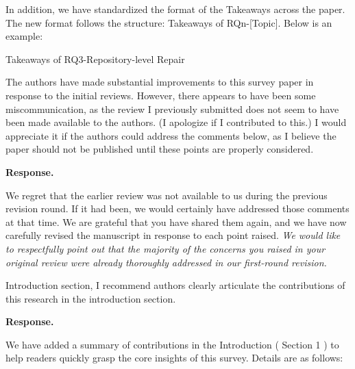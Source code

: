 \documentclass[acmsmall]{acmart}
\begin{document}
	In addition, we have standardized the format of the Takeaways across the paper. The new format follows
	the structure: Takeaways of RQn-[Topic]. Below is an example:

	\color{blue}
	Takeaways of RQ3-Repository-level Repair
	\color{black}

	\begin{tcolorbox}
		[commentbox,title=Reviewer \#2 - Comment 2] The authors have made substantial improvements
		to this survey paper in response to the initial reviews. However, there appears to have been
		some miscommunication, as the review I previously submitted does not seem to have been made available
		to the authors. (I apologize if I contributed to this.) I would appreciate it if the authors
		could address the comments below, as I believe the paper should not be published until these
		points are properly considered.
	\end{tcolorbox}

	\noindent
	\textbf{Response.}

	We regret that the earlier review was not available to us during the previous revision round. If
	it had been, we would certainly have addressed those comments at that time. We are grateful that
	you have shared them again, and we have now carefully revised the manuscript in response to each
	point raised. \textit{We would like to respectfully point out that the majority of the concerns
	you raised in your original review were already thoroughly addressed in our first-round revision.}

	\begin{tcolorbox}
		[commentbox,title=Reviewer \#2 - Comment 3] Introduction section, I recommend authors clearly
		articulate the contributions of this research in the introduction section.
	\end{tcolorbox}

	\noindent
	\textbf{Response.}

	We have added a summary of contributions in the Introduction (
	\color{red}
	Section 1
	\color{black}
	) to help readers quickly grasp the core insights of this survey. Details are as follows:
\end{document}
